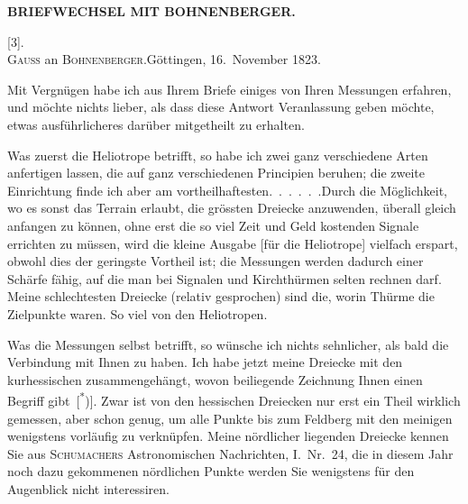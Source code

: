 \noindent{}\hfill{\small\textbf{BRIEFWECHSEL MIT BOHNENBERGER.}}\hfill\null\par\medskip

\begin{center}
[3].\\
\textsc{Gauss} an \textsc{Bohnenberger}.\quad Göttingen, 16.~November 1823.
\end{center}

\par\noindent\hspace*{\parindent}Mit Vergnügen habe ich aus Ihrem Briefe einiges von Ihren Messungen erfahren, und möchte nichts lieber, als dass diese Antwort Veranlassung geben möchte, etwas ausführlicheres darüber mitgetheilt zu erhalten.

\par\noindent\hspace*{\parindent}Was zuerst die Heliotrope betrifft, so habe ich zwei ganz verschiedene Arten anfertigen lassen, die auf ganz verschiedenen Principien beruhen; die zweite Einrichtung finde ich aber am vortheilhaftesten.\ .\ .\ .\ .\ .\quad Durch die Möglichkeit, wo es sonst das Terrain erlaubt, die grössten Dreiecke anzuwenden, überall gleich anfangen zu können, ohne erst die so viel Zeit und Geld kostenden Signale errichten zu müssen, wird die kleine Ausgabe [für die Heliotrope] vielfach erspart, obwohl dies der geringste Vortheil ist; die Messungen werden dadurch einer Schärfe fähig, auf die man bei Signalen und Kirchthürmen selten rechnen darf.
Meine schlechtesten Dreiecke (relativ gesprochen) sind die, worin Thürme die Zielpunkte waren.
So viel von den Heliotropen.

\par\noindent\hspace*{\parindent}Was die Messungen selbst betrifft, so wünsche ich nichts sehnlicher, als bald die Verbindung mit Ihnen zu haben.
Ich habe jetzt meine Dreiecke mit den kurhessischen zusammengehängt, wovon beiliegende Zeichnung Ihnen einen Begriff gibt~[\textsuperscript{*})].
Zwar ist von den hessischen Dreiecken nur erst ein Theil wirklich gemessen, aber schon genug, um alle Punkte bis zum Feldberg mit den meinigen wenigstens vorläufig zu verknüpfen.
Meine nördlicher liegenden Dreiecke kennen Sie aus \textsc{Schumachers} Astronomischen Nachrichten, I.~Nr.~24, die in diesem Jahr noch dazu gekommenen nördlichen Punkte werden Sie wenigstens für den Augenblick nicht interessiren.

